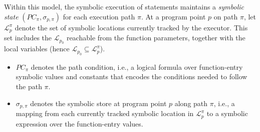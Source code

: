 

Within this model, the symbolic execution of statements maintains a
\emph{symbolic state} $(PC_\pi, \sigma_{p,\pi})$ for each execution
path $\pi$.
At a program point $p$ on path $\pi$, let $\mathcal{L}^{\pi}_{p}$
denote the set of symbolic locations currently tracked by the
executor. This set includes the 
$\mathcal{L}_{p_0}$ reachable from the function parameters,
together with the local variables  (hence
$\mathcal{L}_{p_0}\subseteq\mathcal{L}^{\pi}_{p}$).

\begin{itemize}
\item $PC_\pi$ denotes the path condition, i.e., a logical formula
over function-entry symbolic values and constants that encodes
the conditions needed to follow the path $\pi$.

\item $\sigma_{p,\pi}$ denotes the symbolic store at program
point $p$ along path $\pi$, i.e., a mapping from each currently
tracked symbolic location in $\mathcal{L}^{\pi}_{p}$ to a
symbolic expression over the function-entry values.
\end{itemize}

